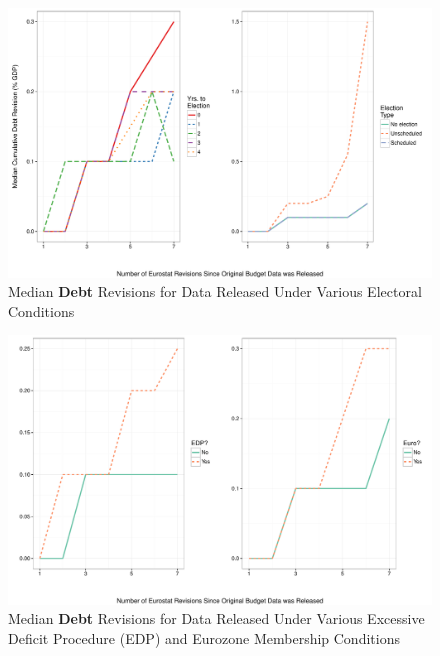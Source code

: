 \documentclass[]{article}
\begin{document}
\begin{figure}
    \begin{center}
        \caption{Median \textbf{Debt} Revisions for Data Released Under Various Electoral Conditions}
        \label{median_debt_revisions}
        \includegraphics[scale=0.55]{figures/median_debt_revisions.pdf}
    \end{center}
\end{figure}

\begin{figure}
    \begin{center}
        \caption{Median \textbf{Debt} Revisions for Data Released Under Various Excessive Deficit Procedure (EDP) and Eurozone Membership Conditions}
        \label{median_debt_revisions_edp_eu}
        \includegraphics[scale=0.55]{figures/median_debt_revisions_edp_euro.pdf}
    \end{center}
\end{figure}
\end{document}

